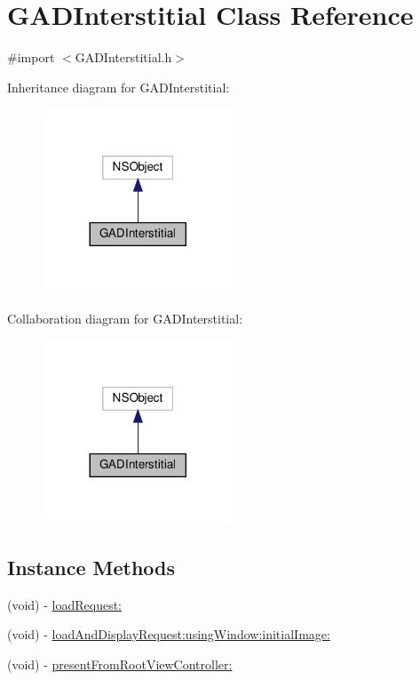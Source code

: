 \hypertarget{interfaceGADInterstitial}{}\section{G\+A\+D\+Interstitial Class Reference}
\label{interfaceGADInterstitial}


{\ttfamily \#import $<$G\+A\+D\+Interstitial.\+h$>$}



Inheritance diagram for G\+A\+D\+Interstitial\+:
\nopagebreak
\begin{figure}[H]
\begin{center}
\leavevmode
\includegraphics[width=161pt]{interfaceGADInterstitial__inherit__graph}
\end{center}
\end{figure}


Collaboration diagram for G\+A\+D\+Interstitial\+:
\nopagebreak
\begin{figure}[H]
\begin{center}
\leavevmode
\includegraphics[width=161pt]{interfaceGADInterstitial__coll__graph}
\end{center}
\end{figure}
\subsection*{Instance Methods}
\begin{DoxyCompactItemize}
\item 
(void) -\/ \hyperlink{interfaceGADInterstitial_aa469fd3d2e59b8bd9d8f69cfaa28dbf3}{load\+Request\+:}
\item 
(void) -\/ \hyperlink{interfaceGADInterstitial_aa8232e1a7be46e42c6eac9e164636a9b}{load\+And\+Display\+Request\+:using\+Window\+:initial\+Image\+:}
\item 
(void) -\/ \hyperlink{interfaceGADInterstitial_ac002c3a84433c3e56e4cc356bcfbbd91}{present\+From\+Root\+View\+Controller\+:}
\end{DoxyCompactItemize}
